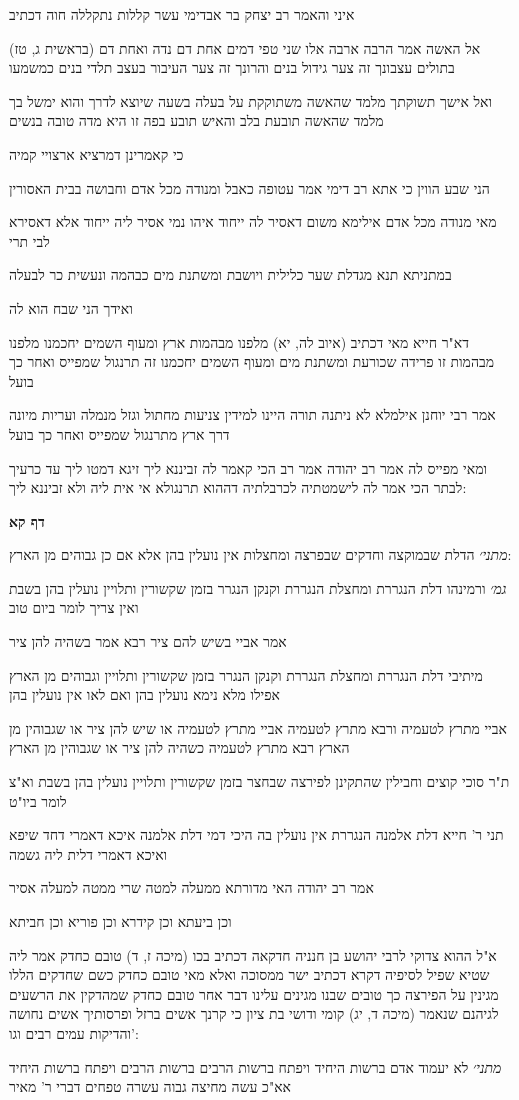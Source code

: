 \documentclass[12pt, openany]{book}
\newcommand{\sethebfont}{
\fontsize{10.5pt}{21.0pt} \selectfont
}
\newcommand{\textblock}[1]{
{\sethebfont #1\\}	
}
\newcommand{\sectname}{}
\newcommand{\newsection}[1]{
	\addcontentsline{toc}{section}{#1}
	\renewcommand{\sectname}{#1}	
	\vspace{-\baselineskip}
	\begin{center}
		\textbf{%
\fontsize{16pt}{16pt}\selectfont
			#1}
	\end{center}
	\vspace{-\baselineskip}
	\nopagebreak
}
\begin{document}
\textblock{איני והאמר רב יצחק בר אבדימי עשר קללות נתקללה חוה דכתיב}
\textblock{(בראשית ג, טז) אל האשה אמר הרבה ארבה אלו שני טפי דמים אחת דם נדה ואחת דם בתולים עצבונך זה צער גידול בנים והרונך זה צער העיבור בעצב תלדי בנים כמשמעו}
\textblock{ואל אישך תשוקתך מלמד שהאשה משתוקקת על בעלה בשעה שיוצא לדרך והוא ימשל בך מלמד שהאשה תובעת בלב והאיש תובע בפה זו היא מדה טובה בנשים}
\textblock{כי קאמרינן דמרציא ארצויי קמיה}
\textblock{הני שבע הווין כי אתא רב דימי אמר עטופה כאבל ומנודה מכל אדם וחבושה בבית האסורין}
\textblock{מאי מנודה מכל אדם אילימא משום דאסיר לה ייחוד איהו נמי אסיר ליה ייחוד אלא דאסירא לבי תרי}
\textblock{במתניתא תנא מגדלת שער כלילית ויושבת ומשתנת מים כבהמה ונעשית כר לבעלה}
\textblock{ואידך הני שבח הוא לה}
\textblock{דא"ר חייא מאי דכתיב (איוב לה, יא) מלפנו מבהמות ארץ ומעוף השמים יחכמנו מלפנו מבהמות זו פרידה שכורעת ומשתנת מים ומעוף השמים יחכמנו זה תרנגול שמפייס ואחר כך בועל}
\textblock{אמר רבי יוחנן אילמלא לא ניתנה תורה היינו למידין צניעות מחתול וגזל מנמלה ועריות מיונה דרך ארץ מתרנגול שמפייס ואחר כך בועל}
\textblock{ומאי מפייס לה אמר רב יהודה אמר רב הכי קאמר לה זביננא ליך זיגא דמטו ליך עד כרעיך לבתר הכי אמר לה לישמטתיה לכרבלתיה דההוא תרנגולא אי אית ליה ולא זביננא ליך:}
\newsection{דף קא}
\textblock{{\large\emph{מתני׳}} הדלת שבמוקצה וחדקים שבפרצה ומחצלות אין נועלין בהן אלא אם כן גבוהים מן הארץ:}
\textblock{{\large\emph{גמ׳}} ורמינהו דלת הנגררת ומחצלת הנגררת וקנקן הנגרר בזמן שקשורין ותלויין נועלין בהן בשבת ואין צריך לומר ביום טוב}
\textblock{אמר אביי בשיש להם ציר רבא אמר בשהיה להן ציר}
\textblock{מיתיבי דלת הנגררת ומחצלת הנגררת וקנקן הנגרר בזמן שקשורין ותלויין וגבוהים מן הארץ אפילו מלא נימא נועלין בהן ואם לאו אין נועלין בהן}
\textblock{אביי מתרץ לטעמיה ורבא מתרץ לטעמיה אביי מתרץ לטעמיה או שיש להן ציר או שגבוהין מן הארץ רבא מתרץ לטעמיה כשהיה להן ציר או שגבוהין מן הארץ}
\textblock{ת"ר סוכי קוצים וחבילין שהתקינן לפירצה שבחצר בזמן שקשורין ותלויין נועלין בהן בשבת וא"צ לומר ביו"ט}
\textblock{תני ר' חייא דלת אלמנה הנגררת אין נועלין בה היכי דמי דלת אלמנה איכא דאמרי דחד שיפא ואיכא דאמרי דלית ליה גשמה}
\textblock{אמר רב יהודה האי מדורתא ממעלה למטה שרי ממטה למעלה אסיר}
\textblock{וכן ביעתא וכן קידרא וכן פוריא וכן חביתא}
\textblock{א"ל ההוא צדוקי לרבי יהושע בן חנניה חדקאה דכתיב בכו (מיכה ז, ד) טובם כחדק אמר ליה שטיא שפיל לסיפיה דקרא דכתיב ישר ממסוכה ואלא מאי טובם כחדק כשם שחדקים הללו מגינין על הפירצה כך טובים שבנו מגינים עלינו דבר אחר טובם כחדק שמהדקין את הרשעים לגיהנם שנאמר (מיכה ד, יג) קומי ודושי בת ציון כי קרנך אשים ברזל ופרסותיך אשים נחושה והדיקות עמים רבים וגו':}
\textblock{{\large\emph{מתני׳}} לא יעמוד אדם ברשות היחיד ויפתח ברשות הרבים ברשות הרבים ויפתח ברשות היחיד אא"כ עשה מחיצה גבוה עשרה טפחים דברי ר' מאיר}
\end{document}
